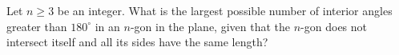 Let $n \ge 3$ be an integer. What is the largest possible number of interior angles greater than $180^\circ$ in an $n$-gon in the plane, given that the $n$-gon does not intersect itself and all its sides have the same length?